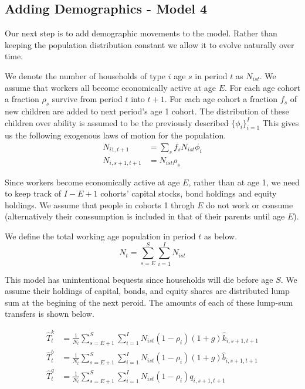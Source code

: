 \documentclass[letterpaper,12pt]{article}
\theoremstyle{definition}
\numberwithin{equation}{section}
\begin{document}
\begin{spacing}{1.5}
  \subsection{Adding Demographics - Model 4}\label{SubSec_Macro_Demog}
    Our next step is to add demographic movements to the model.  Rather than keeping the population distribution constant we allow it to evolve naturally over time.

    We denote the number of households of type $i$ age $s$ in period $t$ as $N_{ist}$.  We assume that workers all become economically active at age $E$.  For each age cohort a fraction $\rho_s$ survive from period $t$ into $t+1$.  For each age cohort a fraction $f_s$ of new children are added to next period's age 1 cohort.  The distribution of these children over ability is assumed to be the previously described $\{\phi_i\}_{i=1}^I$  This gives us the following exogenous laws of motion for the population.
    \begin{align} 
    N_{i1,t+1} & = \sum_s f_s N_{ist} \phi_i \label{Macro_Demog_PopEvola}\\
    N_{i,s+1,t+1} & = N_{ist} \rho_s \label{Macro_Demog_PopEvolb}
    \end{align}

    Since workers become economically active at age $E$, rather than at age 1, we need to keep track of $I-E+1$ cohorts' capital stocks, bond holdings and equity holdings.  We assume that people in cohorts 1 throgh $E$ do not work or consume (alternatively their conssumption is included in that of their parents until age $E$).

    We define the total working age population in period $t$ as below.
    \begin{equation} \label{Macro_Demog_Pop}
    N_t = \sum_{s=E}^S \sum_{i=1}^I N_{ist}
    \end{equation}

    This model has unintentional bequests since households will die before age $S$.  We assume their holdings of capital, bonds, and equity shares are distributed lump sum at the begining of the next peroid.  The amounts of each of these lump-sum transfers is shown below.

    \begin{align}
    \hat T^k_t & = \frac{1}{N_t}\sum_{s=E+1}^S \sum_{i=1}^I N_{ist} (1-\rho_i) (1+g)\hat k_{i,s+1,t+1} \\
    \hat T^b_t & = \frac{1}{N_t}\sum_{s=E+1}^S \sum_{i=1}^I N_{ist} (1-\rho_i) (1+g)\hat b_{i,s+1,t+1} \\
    \hat T^q_t & = \frac{1}{N_t}\sum_{s=E+1}^S \sum_{i=1}^I N_{ist} (1-\rho_i) q_{i,s+1,t+1}
    \end{align}


\end{spacing}
\end{document}
